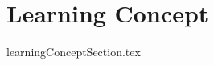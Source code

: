 \documentclass[class=book , crop=false]{standalone}
\begin{document}
\chapter{Learning Concept}
{learningConceptSection.tex}
\clearpage
\end{document}
